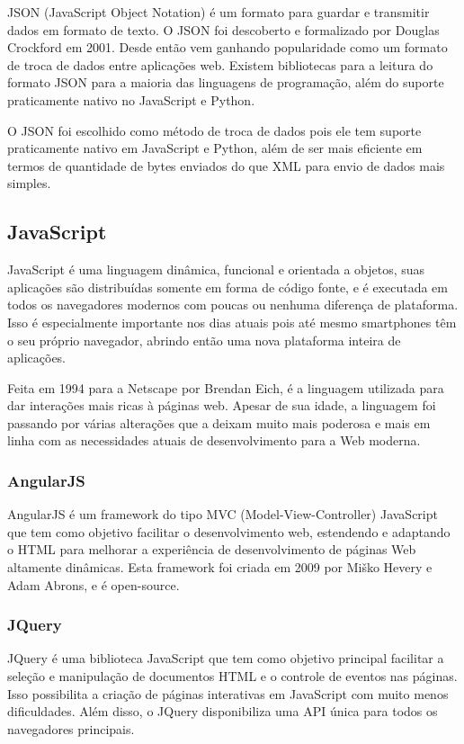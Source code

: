 \documentclass[
	article,			%
	11pt,				%
	oneside,			%
	a4paper,			%
	english,			%
	brazil,				%
	sumario=tradicional
	]{abntex2}
\begin{document}
JSON (JavaScript Object Notation) é um formato para guardar e transmitir dados em formato de texto.
O JSON foi descoberto e formalizado por Douglas Crockford em 2001. \cite{json}
Desde então vem ganhando popularidade como um formato de troca de dados entre aplicações web.
Existem bibliotecas para a leitura do formato JSON para a maioria das linguagens de programação, além do suporte praticamente nativo no JavaScript e Python.

O JSON foi escolhido como método de troca de dados pois ele tem suporte praticamente nativo em JavaScript e Python, além de ser mais eficiente em termos de quantidade de bytes enviados do que XML para envio de dados mais simples.

\subsection{JavaScript}

JavaScript é uma linguagem dinâmica, funcional e orientada a objetos, suas aplicações são distribuídas somente em forma de código fonte, e é executada em todos os navegadores modernos com poucas ou nenhuma diferença de plataforma.
Isso é especialmente importante nos dias atuais pois até mesmo smartphones têm o seu próprio navegador, abrindo então uma nova plataforma inteira de aplicações.

Feita em 1994 para a Netscape por Brendan Eich, é a linguagem utilizada para dar interações mais ricas à páginas web.
Apesar de sua idade, a linguagem foi passando por várias alterações que a deixam muito mais poderosa e mais em linha com as necessidades atuais de desenvolvimento para a Web moderna.

\subsubsection{AngularJS}

AngularJS é um framework do tipo MVC (Model-View-Controller) JavaScript que tem como objetivo facilitar o desenvolvimento web, estendendo e adaptando o HTML para melhorar a experiência de desenvolvimento de páginas Web altamente dinâmicas.
Esta framework foi criada em 2009 por Miško Hevery e Adam Abrons, e é open-source. \cite{angularjs}

\subsubsection{JQuery}

JQuery é uma biblioteca JavaScript que tem como objetivo principal facilitar a seleção e manipulação de documentos HTML e o controle de eventos nas páginas.
Isso possibilita a criação de páginas interativas em JavaScript com muito menos dificuldades.
Além disso, o JQuery disponibiliza uma API única para todos os navegadores principais. \cite{jquery}
\end{document}
